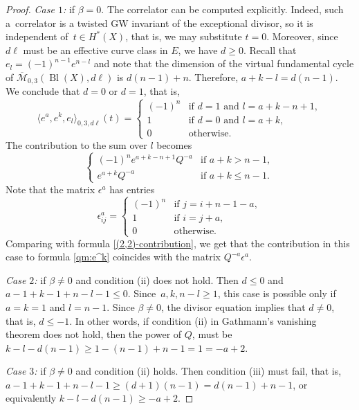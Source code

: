 \documentclass[10pt,a4paper]{article}
\numberwithin{equation}{section}
\begin{document}
\begin{proof}
{\em Case $1$:} if $\beta=0$. The correlator  can be computed explicitly. Indeed, such a~correlator is a twisted GW invariant of the exceptional divisor, so it
is independent of~$t\in H^*(X)$, that is, we may substitute
$t=0$. Moreover, since $d\ell$ must be an effective curve class in
$E$, we have $d\geq 0$. Recall that $e_l= (-1)^{n-1} e^{n-l}$ and note that the
dimension of the virtual fundamental cycle of
$\overline{\mathcal{M}}_{0,3}(\operatorname{Bl}(X), d\ell) $ is $d
(n-1)+n$. Therefore, $a+k-l = d(n-1) $. We conclude that $d=0$ or
$d=1$, that is,
\[
\big\langle e^a, e^k, e_l \big\rangle_{0,3,d\ell}(t)=
\begin{cases}
(-1)^n & \mbox{if $d=1$ and $l=a+k-n+1$},\\
1 & \mbox{if $d=0$ and $l=a+k$},\\
0 & \mbox{otherwise.}
\end{cases}
\]
The contribution to the sum over $l$ becomes
\begin{equation}\label{(2,2)-contribution}
\begin{cases}
(-1)^n e^{a+k-n+1} Q^{-a} & \mbox{if $a+k>n-1$}, \\
e^{a+k} Q^{-a}& \mbox{if $a+k\leq n-1$}.
\end{cases}
\end{equation}
Note that the matrix $\epsilon^a$ has entries
\[
\epsilon^a_{ij}=
\begin{cases}
(-1)^n & \mbox{if $j=i+ n-1-a$}, \\
1 & \mbox{if $i=j+a$},\\
0 & \mbox{otherwise}.
\end{cases}
\]
Comparing with formula \eqref{(2,2)-contribution}, we get that the
contribution in this case to formula \eqref{qm:e^k} coincides with the
matrix $Q^{-a} \epsilon^a$.

{\em Case $2$:} if $\beta\neq 0$ and condition (ii) does not hold.
Then $d\leq 0$ and $a-1+k-1+n-l-1\leq 0$. Since~${a,k,n-l\geq 1}$, this
case is possible only if $a=k=1$ and $l=n-1$. Since $\beta\neq 0$, the
 divisor equation implies that $d\neq 0$, that is, $d\leq -1$. In
 other words, if condition (ii) in Gathmann's
 vanishing theorem does not hold, then the power of $Q$, must be
 $k-l-d(n-1)\geq 1-(n-1) + n-1 =1=-a+2$.

{\em Case $3$:} if $\beta\neq 0$ and condition (ii) holds.
Then condition (iii) must fail, that is, $a-1+k-1+n-l-1\geq
(d+1)(n-1)=d(n-1) +n-1$, or equivalently
 $k-l-d(n-1)\geq -a+2$.


\end{proof}
\end{document}
